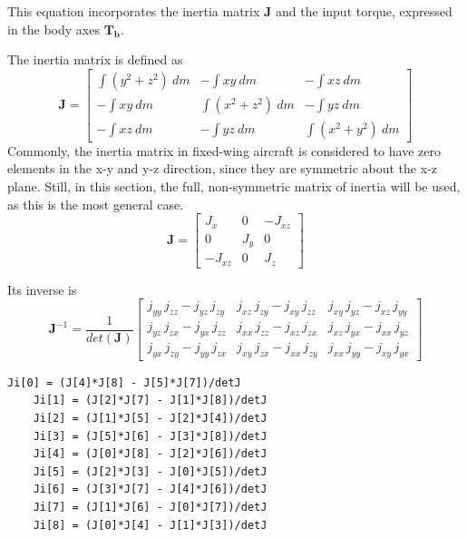 This equation incorporates the inertia matrix $\bm{J}$ and the input torque, expressed in the body axes $\bm{T_b}$.

The inertia matrix is defined as
\begin{equation}
	\bm{J} =
	\begin{bmatrix}
		\int(y^2 + z^2)~dm & -\int xy~dm        & -\int xz~dm        \\
		-\int xy~dm        & \int(x^2 + z^2)~dm & -\int yz~dm        \\
		-\int xz~dm        & -\int yz~dm        & \int(x^2 + y^2)~dm
	\end{bmatrix}
\end{equation}
Commonly, the inertia matrix in fixed-wing aircraft is considered to have zero elements in the x-y and y-z direction, since they are symmetric about the x-z plane.
Still, in this section, the full, non-symmetric matrix of inertia will be used, as this is the most general case.
\begin{equation}\label{eq:inertiaMat}
	\bm{J} = 
	\begin{bmatrix}
		J_x     & 0   & -J_{xz} \\
		0       & J_y & 0       \\
		-J_{xz} & 0   & J_z
	\end{bmatrix}
\end{equation}

Its inverse is
\begin{equation}
	\bm{J}^{-1} = \frac{1}{det(\bm{J})}
	\begin{bmatrix}
		{j}_{yy}\, {j}_{zz} - {j}_{yz}\, {j}_{zy} & {j}_{xz}\, {j}_{zy} - {j}_{xy}\, {j}_{zz} & {j}_{xy}\, {j}_{yz} - {j}_{xz}\, {j}_{yy}\\
		{j}_{yz}\, {j}_{zx} - {j}_{yx}\, {j}_{zz} & {j}_{xx}\, {j}_{zz} - {j}_{xz}\, {j}_{zx} & {j}_{xz}\, {j}_{yx} - {j}_{xx}\, {j}_{yz}\\
		{j}_{yx}\, {j}_{zy} - {j}_{yy}\, {j}_{zx} & {j}_{xy}\, {j}_{zx} - {j}_{xx}\, {j}_{zy} & {j}_{xx}\, {j}_{yy} - {j}_{xy}\, {j}_{yx}
	\end{bmatrix}
\end{equation}
\begin{lstlisting}[style=C-style]
	Ji[0] = (J[4]*J[8] - J[5]*J[7])/detJ
	Ji[1] = (J[2]*J[7] - J[1]*J[8])/detJ
	Ji[2] = (J[1]*J[5] - J[2]*J[4])/detJ
	Ji[3] = (J[5]*J[6] - J[3]*J[8])/detJ
	Ji[4] = (J[0]*J[8] - J[2]*J[6])/detJ
	Ji[5] = (J[2]*J[3] - J[0]*J[5])/detJ
	Ji[6] = (J[3]*J[7] - J[4]*J[6])/detJ
	Ji[7] = (J[1]*J[6] - J[0]*J[7])/detJ
	Ji[8] = (J[0]*J[4] - J[1]*J[3])/detJ
\end{lstlisting}

